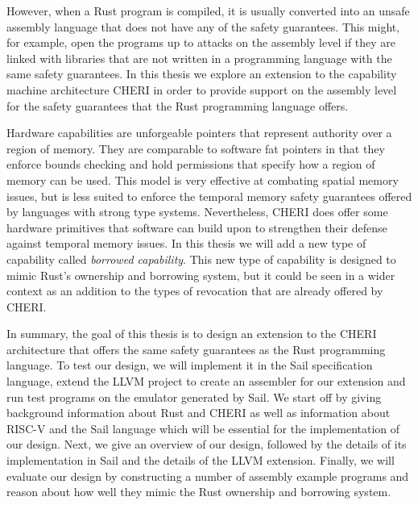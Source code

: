 However, when a Rust program is compiled, it is usually converted into an unsafe assembly language that does not have any of the safety guarantees.
This might, for example, open the programs up to attacks on the assembly level if they are linked with libraries that are not written in a programming language with the same safety guarantees.
In this thesis we explore an extension to the capability machine architecture CHERI in order to provide support on the assembly level for the safety guarantees that the Rust programming language offers.

Hardware capabilities are unforgeable pointers that represent authority over a region of memory.
They are comparable to software fat pointers in that they enforce bounds checking and hold permissions that specify how a region of memory can be used.
This model is very effective at combating spatial memory issues, but is less suited to enforce the temporal memory safety guarantees offered by languages with strong type systems.
Nevertheless, CHERI does offer some hardware primitives that software can build upon to strengthen their defense against temporal memory issues.
In this thesis we will add a new type of capability called \textit{borrowed capability}.
This new type of capability is designed to mimic Rust's ownership and borrowing system, but it could be seen in a wider context as an addition to the types of revocation that are already offered by CHERI.

In summary, the goal of this thesis is to design an extension to the CHERI architecture that offers the same safety guarantees as the Rust programming language.
To test our design, we will implement it in the Sail specification language, extend the LLVM project to create an assembler for our extension and run test programs on the emulator generated by Sail.
We start off by giving background information about Rust and CHERI as well as information about RISC-V and the Sail language which will be essential for the implementation of our design.
Next, we give an overview of our design, followed by the details of its implementation in Sail and the details of the LLVM extension.
Finally, we will evaluate our design by constructing a number of assembly example programs and reason about how well they mimic the Rust ownership and borrowing system.

